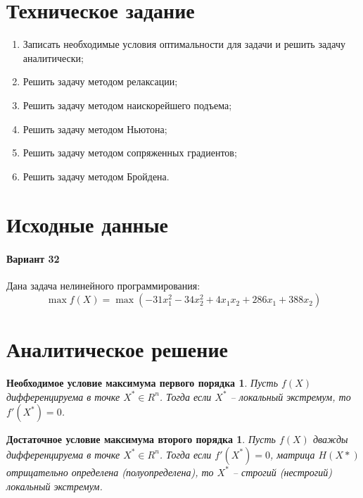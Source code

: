 





\tableofcontents
\listoffigures
\newpage

\section{Техническое задание}

\begin{enumerate}
	\setlength{\itemsep}{0em}
	\item Записать необходимые условия оптимальности для задачи и решить задачу аналитически;
	\item Решить задачу методом релаксации;
	\item Решить задачу методом наискорейшего подъема;
	\item Решить задачу методом Ньютона;
	\item Решить задачу методом сопряженных градиентов;
	\item Решить задачу методом Бройдена.
\end{enumerate}

\section{Исходные данные}

\paragraph{Вариант 32}

Дана задача нелинейного программирования:
\begin{equation*}
	\max f(X) = \max \left( -31 x_1^2 - 34 x_2^2 + 4 x_1 x_2 + 286 x_1 + 388 x_2 \right)
\end{equation*}

\section{Аналитическое решение}

\newtheorem*{theorem1}{Необходимое условие максимума первого порядка}
\begin{theorem1}
Пусть $f(X)$ дифференцируема в точке $X^* \in R^n$. Тогда если $X^*$ -- локальный экстремум, то $f'(X^*) = 0$. 
\end{theorem1}

\newtheorem*{theorem2}{Достаточное условие максимума второго порядка}
\begin{theorem2}
Пусть $f(X)$ дважды дифференцируема в точке $X^* \in R^n$. Тогда если $f'(X^*) = 0$, матрица $H(X*)$ отрицательно определена (полуопределена), то $X^*$ -- строгий (нестрогий) локальный экстремум.
\end{theorem2}

